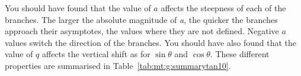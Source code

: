 \documentclass[10pt,a4paper,titlepage,twoside,openright]{report}
\begin{document}

You should have found that the value of $a$ affects the steepness of each of the branches. The larger the absolute magnitude of \textit{a}, the quicker the branches approach their asymptotes, the values where they are not defined. Negative $\textit{a}$ values switch the direction of the branches.
You should have also found that the value of $q$ affects the vertical shift as for $\sin\theta$ and $\cos \theta$.
These different properties are summarised in Table~\ref{tab:mt:g:summarytan10}.
\end{document}
